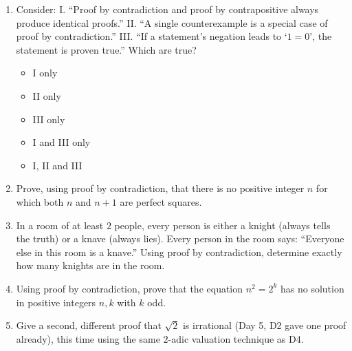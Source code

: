 \documentclass[11pt,a4paper]{article}
\begin{document}
\begin{enumerate}

\item Consider: I. ``Proof by contradiction and proof by contrapositive always produce identical proofs.'' II. ``A single counterexample is a special case of proof by contradiction.'' III. ``If a statement's negation leads to `$1=0$', the statement is proven true.'' Which are true?
\begin{itemize}
\item[A)] I only
\item[B)] II only
\item[C)] III only
\item[D)] I and III only
\item[E)] I, II and III
\end{itemize}

\item Prove, using proof by contradiction, that there is no positive integer $n$ for which both $n$ and $n+1$ are perfect squares.

\item In a room of at least $2$ people, every person is either a knight (always tells the truth) or a knave (always lies). Every person in the room says: ``Everyone else in this room is a knave.'' Using proof by contradiction, determine exactly how many knights are in the room.

\item Using proof by contradiction, prove that the equation $n^2=2^k$ has no solution in positive integers $n,k$ with $k$ odd.

\item Give a second, different proof that $\sqrt2$ is irrational (Day 5, D2 gave one proof already), this time using the same $2$-adic valuation technique as D4.

\end{enumerate}

\end{document}
